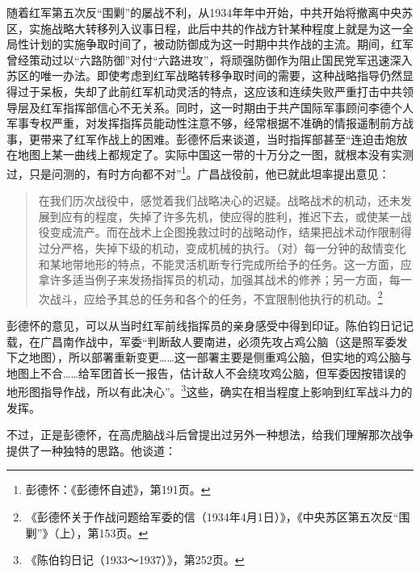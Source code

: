 随着红军第五次反“围剿”的屡战不利，从1934年年中开始，中共开始将撤离中央苏区，实施战略大转移列入议事日程，此后中共的作战方针某种程度上就是为这一全局性计划的实施争取时间了，被动防御成为这一时期中共作战的主流。期间，红军曾经策动过以“六路防御”对付“六路进攻”，将顽强防御作为阻止国民党军迅速深入苏区的唯一办法。即使考虑到红军战略转移争取时间的需要，这种战略指导仍然显得过于呆板，失却了此前红军机动灵活的特点，这应该和连续失败严重打击中共领导层及红军指挥部信心不无关系。同时，这一时期由于共产国际军事顾问李德个人军事专权严重，对发挥指挥员能动性注意不够，经常根据不准确的情报遥制前方战事，更带来了红军作战上的困难。彭德怀后来谈道，当时指挥部甚至“连迫击炮放在地图上某一曲线上都规定了。实际中国这一带的十万分之一图，就根本没有实测过，只是问测的，有时方向都不对”\footnote{彭德怀：《彭德怀自述》，第191页。}。广昌战役前，他已就此坦率提出意见：

\begin{quote}

在我们历次战役中，感觉着我们战略决心的迟疑。战略战术的机动，还未发展到应有的程度，失掉了许多先机，使应得的胜利，推迟下去，或使某一战役变成流产。而在战术上企图挽救过时的战略动作，结果把战术动作限制得过分严格，失掉下级的机动，变成机械的执行。（对）每一分钟的敌情变化和某地带地形的特点，不能灵活机断专行完成所给予的任务。这一方面，应拿许多适当例子来发扬指挥员的机动，加强其战术的修养；另一方面，每一次战斗，应给予其总的任务和各个的任务，不宜限制他执行的机动。\footnote{《彭德怀关于作战问题给军委的信（1934年4月1日）》，《中央苏区第五次反“围剿”》（上），第153页。}
\end{quote}


彭德怀的意见，可以从当时红军前线指挥员的亲身感受中得到印证。陈伯钧日记记载，在广昌南作战中，军委“判断敌人要南进，必须先攻占鸡公脑（这是照军委发下之地图），所以部署重新变更……这一部署主要是侧重鸡公脑，但实地的鸡公脑与地图上不合……给军团首长一报告，估计敌人不会绕攻鸡公脑，但军委因按错误的地形图指导作战，所以有此决心”。\footnote{《陈伯钧日记（1933～1937）》，第252页。}这些，确实在相当程度上影响到红军战斗力的发挥。


不过，正是彭德怀，在高虎脑战斗后曾提出过另外一种想法，给我们理解那次战争提供了一种独特的思路。他谈道：

